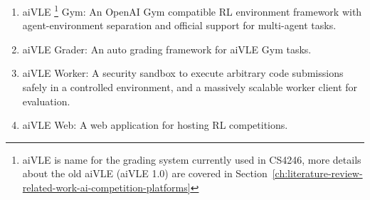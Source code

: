 \documentclass[fyp]{socreport}
\begin{document}
\begin{enumerate}
    \item aiVLE \footnote{aiVLE is name for the grading system currently used in CS4246, more details about the old aiVLE (aiVLE 1.0) are covered in Section~\ref{ch:literature-review-related-work-ai-competition-platforms}} Gym: An OpenAI Gym \cite{openai-gym} compatible RL environment framework with agent-environment separation and official support for multi-agent tasks.
    \item aiVLE Grader: An auto grading framework for aiVLE Gym tasks.
    \item aiVLE Worker: A security sandbox to execute arbitrary code submissions safely in a controlled environment, and a massively scalable worker client for evaluation.
    \item aiVLE Web: A web application for hosting RL competitions.
\end{enumerate}
\end{document}
